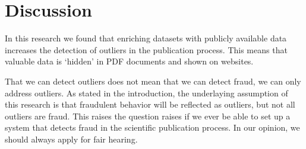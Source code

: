 \documentclass{ou-report}
\begin{document}


\section{Discussion}
\label{sec:discussion}



In this research we found that enriching datasets with publicly available data 
increases the detection of outliers in the publication process. This means that 
valuable data is `hidden’ in PDF documents and shown on websites. 

That we can detect outliers does not mean that we can detect fraud, we can only address outliers. As 
stated in the introduction, the underlaying assumption of this research is that 
fraudulent behavior will be reflected as outliers, but not all outliers are 
fraud. This raises the question raises if we ever be able to set up a system 
that detects fraud in the scientific publication process. In our opinion, we 
should always apply for fair hearing.
\end{document}
